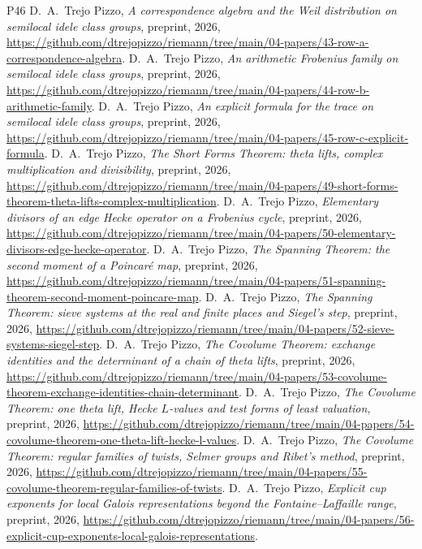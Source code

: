 \documentclass[10pt]{amsart}
\theoremstyle{definition}
\theoremstyle{remark}
\begin{document}
\begin{thebibliography}{P46}
 D.~A.~Trejo Pizzo,
\emph{A correspondence algebra and the Weil distribution on semilocal idele
class groups}, preprint, 2026, \url{https://github.com/dtrejopizzo/riemann/tree/main/04-papers/43-row-a-correspondence-algebra}.
 D.~A.~Trejo Pizzo,
\emph{An arithmetic Frobenius family on semilocal idele class groups},
preprint, 2026, \url{https://github.com/dtrejopizzo/riemann/tree/main/04-papers/44-row-b-arithmetic-family}.
 D.~A.~Trejo Pizzo, \emph{An explicit formula for the trace on semilocal idele class groups}, preprint, 2026, \url{https://github.com/dtrejopizzo/riemann/tree/main/04-papers/45-row-c-explicit-formula}.
 D.~A.~Trejo Pizzo, \emph{The Short Forms Theorem: theta lifts, complex multiplication and divisibility}, preprint, 2026, \url{https://github.com/dtrejopizzo/riemann/tree/main/04-papers/49-short-forms-theorem-theta-lifts-complex-multiplication}.
 D.~A.~Trejo Pizzo, \emph{Elementary divisors of an edge Hecke operator on a Frobenius cycle}, preprint, 2026, \url{https://github.com/dtrejopizzo/riemann/tree/main/04-papers/50-elementary-divisors-edge-hecke-operator}.
 D.~A.~Trejo Pizzo, \emph{The Spanning Theorem: the second moment of a Poincar\'e map}, preprint, 2026, \url{https://github.com/dtrejopizzo/riemann/tree/main/04-papers/51-spanning-theorem-second-moment-poincare-map}.
 D.~A.~Trejo Pizzo, \emph{The Spanning Theorem: sieve systems at the real and finite places and Siegel's step}, preprint, 2026, \url{https://github.com/dtrejopizzo/riemann/tree/main/04-papers/52-sieve-systems-siegel-step}.
 D.~A.~Trejo Pizzo, \emph{The Covolume Theorem: exchange identities and the determinant of a chain of theta lifts}, preprint, 2026, \url{https://github.com/dtrejopizzo/riemann/tree/main/04-papers/53-covolume-theorem-exchange-identities-chain-determinant}.
 D.~A.~Trejo Pizzo, \emph{The Covolume Theorem: one theta lift, Hecke $L$-values and test forms of least valuation}, preprint, 2026, \url{https://github.com/dtrejopizzo/riemann/tree/main/04-papers/54-covolume-theorem-one-theta-lift-hecke-l-values}.
 D.~A.~Trejo Pizzo, \emph{The Covolume Theorem: regular families of twists, Selmer groups and Ribet's method}, preprint, 2026, \url{https://github.com/dtrejopizzo/riemann/tree/main/04-papers/55-covolume-theorem-regular-families-of-twists}.
 D.~A.~Trejo Pizzo, \emph{Explicit cup exponents for local Galois representations beyond the Fontaine--Laffaille range}, preprint, 2026, \url{https://github.com/dtrejopizzo/riemann/tree/main/04-papers/56-explicit-cup-exponents-local-galois-representations}.

\end{thebibliography}
\end{document}
